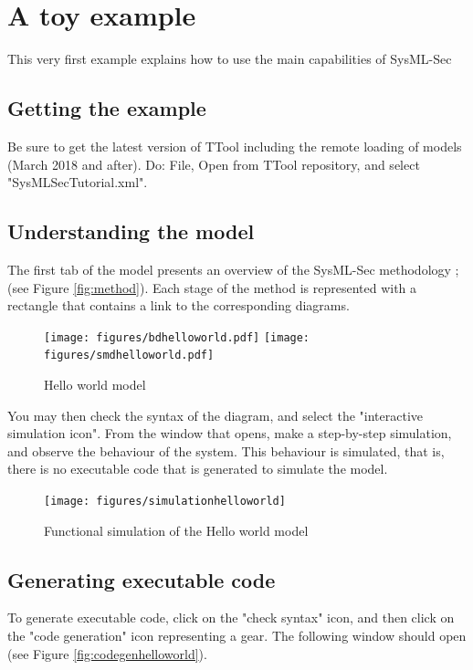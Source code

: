 \documentclass[12pt]{article}
\begin{document}
\newpage
\section{A toy example}\label{sec:example}
This very first example explains how to use the main capabilities of SysML-Sec

\subsection{Getting the example}
Be sure to get the latest version of TTool including the remote loading of models (March 2018 and after). Do: File, Open from TTool repository, and select "SysMLSecTutorial.xml".

\subsection{Understanding the model}
The first tab of the model presents an overview of the SysML-Sec methodology ;(see Figure \ref{fig:method}). Each stage of the method is represented with a rectangle that contains a link to the corresponding diagrams. 


\begin{figure}[htbp]
\centering
\texttt{[image: figures/bdhelloworld.pdf]}
\hspace{1cm}
\texttt{[image: figures/smdhelloworld.pdf]}
\caption{Hello world model} \label{fig:printhelloworld}
\end{figure}

You may then check the syntax of the diagram, and select the "interactive simulation icon". From the window that opens, make a step-by-step simulation, and observe the behaviour of the system. This behaviour is simulated, that is, there is no executable code that is generated to simulate the model.

\begin{figure}[htbp]
\centering
\texttt{[image: figures/simulationhelloworld]}
\caption{Functional simulation of the Hello world model} \label{fig:simuhelloworld}
\end{figure}

\subsection{Generating executable code}
To generate executable code, click on the "check syntax" icon, and then click on the "code generation" icon representing a gear. The following window should open (see Figure \ref{fig:codegenhelloworld}).
\end{document}
